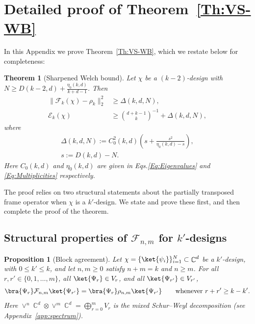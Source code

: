 \documentclass[aps,twocolumn,pra,superscriptaddress,nofootinbib]{revtex4-2}
\newtheorem{thm}{Theorem}
\newtheorem{prop}{Proposition}
\DeclareMathOperator{\C}{\mathbb{C}} %
\begin{document}
\section{Detailed proof of Theorem~\ref{Th:VS-WB}} \label{app:Welchproof}

In this Appendix we prove Theorem~\ref{Th:VS-WB}, which we restate below for completeness:

\begin{thm}[Sharpened Welch bound]
Let $\chi$ be a $(k-2)$-design with
$N\ge D(k-2,d)+\frac{\eta_{0}(k,d)}{k+d-1}$. Then
\begin{align}
\|\mathcal F_k(\chi)-\rho_k\|_2^2 &\ge \Delta(k,d,N),\\
\mathcal E_k(\chi) &\ge \binom{d+k-1}{k}^{-1} + \Delta(k,d,N),
\end{align}
where 
\begin{align}
\Delta(k,d,N)
:= C_{0}^2(k,d)\left(s+\frac{s^{2}}{\eta_{0}(k,d)-s}\right),
\\ s:=D(k,d)-N.
\end{align}
Here $C_{0}(k,d)$ and $\eta_{0}(k,d)$ are given in Eqs.\eqref{Eq:Eigenvalues} and \eqref{Eq:Multiplicities} respectively.
\end{thm}


The proof relies on two structural statements about the partially transposed frame operator when $\chi$ is a $k'$-design. We state and prove these first, and then complete the proof of the theorem.



\subsection{Structural properties of $\mathcal F_{n,m}$ for $k'$-designs}



\begin{prop}[Block agreement]\label{Prop:BlockDiagonalFrameOp}
Let $\chi=\{\ket{\psi_i}\}_{i=1}^N\subset\C^d$ be a $k'$-design, with $0\le k'\le k$, and let
$n,m\ge 0$ satisfy $n+m=k$ and $n\ge m$.
For all $r,r'\in\{0,1,\dots,m\}$, all $\ket{\Psi_r}\in V_r$, and all $\ket{\Psi_{r'}}\in V_{r'}$,
\begin{equation}
\bra{\Psi_r}\mathcal F_{n,m}\ket{\Psi_{r'}}
=
\bra{\Psi_r}\rho_{n,m}\ket{\Psi_{r'}}
\qquad\text{whenever } r+r'\ge k-k'.
\end{equation}
Here $\vee^n\C^d\otimes \vee^m\C^d=\bigoplus_{r=0}^m V_r$ is the mixed Schur--Weyl decomposition
(see Appendix~\ref{app:spectrum}).
\end{prop}
\end{document}

